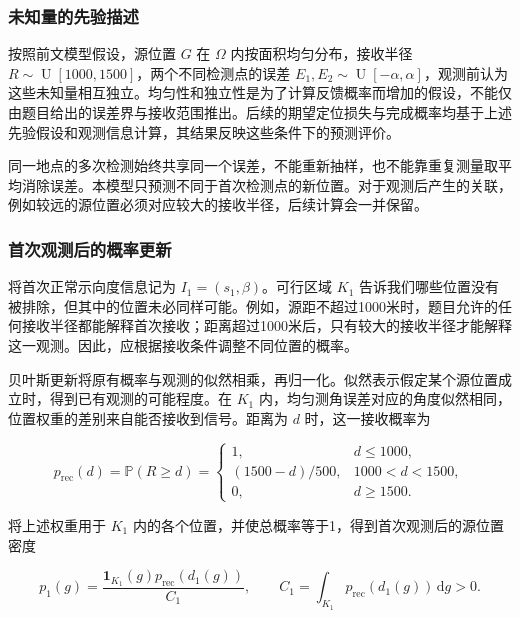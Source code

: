 \documentclass[UTF8,a4paper,zihao=-4,fontset=none]{ctexart}
\begin{document}
\subsubsection{未知量的先验描述}

按照前文模型假设，源位置 \(G\) 在 \(\Omega\) 内按面积均匀分布，接收半径 \(R\sim\operatorname{U}[1000,1500]\)，两个不同检测点的误差 \(E_1,E_2\sim\operatorname{U}[-\alpha,\alpha]\)，观测前认为这些未知量相互独立。均匀性和独立性是为了计算反馈概率而增加的假设，不能仅由题目给出的误差界与接收范围推出。后续的期望定位损失与完成概率均基于上述先验假设和观测信息计算，其结果反映这些条件下的预测评价。

同一地点的多次检测始终共享同一个误差，不能重新抽样，也不能靠重复测量取平均消除误差。本模型只预测不同于首次检测点的新位置。对于观测后产生的关联，例如较远的源位置必须对应较大的接收半径，后续计算会一并保留。

\subsubsection{首次观测后的概率更新}

将首次正常示向度信息记为 \(I_1=(s_1,\beta)\)。可行区域 \(K_1\) 告诉我们哪些位置没有被排除，但其中的位置未必同样可能。例如，源距不超过1000米时，题目允许的任何接收半径都能解释首次接收；距离超过1000米后，只有较大的接收半径才能解释这一观测。因此，应根据接收条件调整不同位置的概率。

贝叶斯更新将原有概率与观测的似然相乘，再归一化。似然表示假定某个源位置成立时，得到已有观测的可能程度。在 \(K_1\) 内，均匀测角误差对应的角度似然相同，位置权重的差别来自能否接收到信号。距离为 \(d\) 时，这一接收概率为

\begin{equation}
 p_{\mathrm{rec}}(d)=\mathbb{P}(R\ge d)=
 \begin{cases}
 1,&d\le1000,\\
 (1500-d)/500,&1000<d<1500,\\
 0,&d\ge1500.
 \end{cases}
\label{eq:q2-pair-weight}
\end{equation}

将上述权重用于 \(K_1\) 内的各个位置，并使总概率等于1，得到首次观测后的源位置密度

\begin{equation}
 p_1(g)=\frac{\mathbf1_{K_1}(g)p_{\mathrm{rec}}(d_1(g))}{C_1},
 \qquad C_1=\int_{K_1}p_{\mathrm{rec}}(d_1(g))\,\mathrm dg>0.
\label{eq:q2-pair-posterior}
\end{equation}
\end{document}
